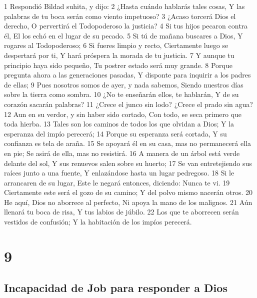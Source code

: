 1 Respondió Bildad suhita, y dijo:  
2 ¿Hasta cuándo hablarás tales cosas,  
Y las palabras de tu boca serán como viento impetuoso?  
3 ¿Acaso torcerá Dios el derecho,  
O pervertirá el Todopoderoso la justicia?  
4 Si tus hijos pecaron contra él,  
El los echó en el lugar de su pecado.  
5 Si tú de mañana buscares a Dios,  
Y rogares al Todopoderoso;  
6 Si fueres limpio y recto,  
Ciertamente luego se despertará por ti,  
Y hará próspera la morada de tu justicia.  
7 Y aunque tu principio haya sido pequeño,  
Tu postrer estado será muy grande.  
8 Porque pregunta ahora a las generaciones pasadas,  
Y disponte para inquirir a los padres de ellas;  
9 Pues nosotros somos de ayer, y nada sabemos,  
Siendo nuestros días sobre la tierra como sombra.  
10 ¿No te enseñarán ellos, te hablarán,  
Y de su corazón sacarán palabras?  
11 ¿Crece el junco sin lodo?  
¿Crece el prado sin agua?  
12 Aun en su verdor, y sin haber sido cortado,  
Con todo, se seca primero que toda hierba.  
13 Tales son los caminos de todos los que olvidan a Dios;  
Y la esperanza del impío perecerá;  
14 Porque su esperanza será cortada,  
Y su confianza es tela de araña.  
15 Se apoyará él en su casa, mas no permanecerá ella en pie;  
Se asirá de ella, mas no resistirá.  
16 A manera de un árbol está verde delante del sol,  
Y sus renuevos salen sobre su huerto;  
17 Se van entretejiendo sus raíces junto a una fuente,  
Y enlazándose hasta un lugar pedregoso.  
18 Si le arrancaren de su lugar,  
Este le negará entonces, diciendo: Nunca te vi.  
19 Ciertamente este será el gozo de su camino;  
Y del polvo mismo nacerán otros.  
20 He aquí, Dios no aborrece al perfecto,  
Ni apoya la mano de los malignos.  
21 Aún llenará tu boca de risa,  
Y tus labios de júbilo.  
22 Los que te aborrecen serán vestidos de confusión;  
Y la habitación de los impíos perecerá.  

\chapter{9}

\section*{Incapacidad de Job para responder a Dios  }


